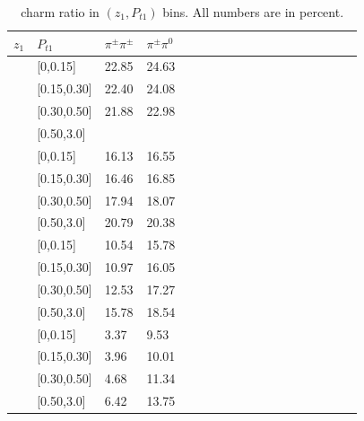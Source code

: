 \begin{table}[H]\footnotesize
\centering
\begin{tabular}{|l|l|l|l|l|l|l|l|l|l|l|l|l|l|l|l|l|l|}
\hline
$z_1$ & $P_{t1}$ &$\pi^{\pm}\pi^{\pm}$ & $\pi^{\pm}\pi^0$ \\ \hline
[0.2,0.3]	&	[0,0.15]	&	22.85	&	24.63	\\ \hline
[0.2,0.3]	&	[0.15,0.30]	&	22.40	&	24.08	\\ \hline
[0.2,0.3]	&	[0.30,0.50]	&	21.88	&	22.98	\\ \hline
[0.2,0.3]	&	[0.50,3.0]	&		&		\\ \hline
[0.3,0.5]	&	[0,0.15]	&	16.13	&	16.55	\\ \hline
[0.3,0.5]	&	[0.15,0.30]	&	16.46	&	16.85	\\ \hline
[0.3,0.5]	&	[0.30,0.50]	&	17.94	&	18.07	\\ \hline
[0.3,0.5]	&	[0.50,3.0]	&	20.79	&	20.38	\\ \hline
[0.5,0.7]	&	[0,0.15]	&	10.54	&	15.78	\\ \hline
[0.5,0.7]	&	[0.15,0.30]	&	10.97	&	16.05	\\ \hline
[0.5,0.7]	&	[0.30,0.50]	&	12.53	&	17.27	\\ \hline
[0.5,0.7]	&	[0.50,3.0]	&	15.78	&	18.54	\\ \hline
[0.7,1.0]	&	[0,0.15]	&	3.37	&	9.53	\\ \hline
[0.7,1.0]	&	[0.15,0.30]	&	3.96	&	10.01	\\ \hline
[0.7,1.0]	&	[0.30,0.50]	&	4.68	&	11.34	\\ \hline
[0.7,1.0]	&	[0.50,3.0]	&	6.42	&	13.75	\\ \hline
\end{tabular}
\caption{charm ratio in $(z_{1},P_{t1})$ bins. All numbers are in percent.}
\label{tab:zptcharmratio}
\end{table}


